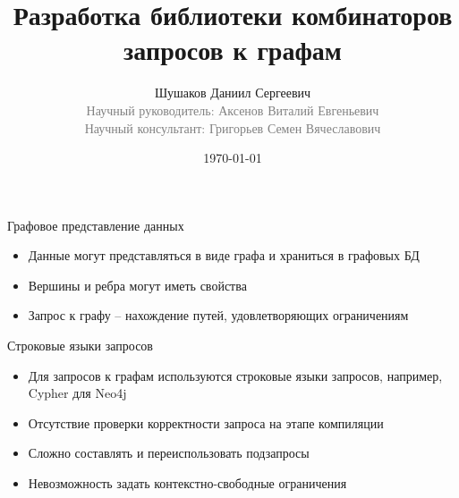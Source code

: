 \documentclass[aspectratio=169]{beamer}
\begin{document}
\title[Комбинаторы запросов к графам]
{
  Разработка библиотеки комбинаторов запросов к графам
}
\author[Шушаков Д.С.]
{
Шушаков Даниил Сергеевич\\
{\footnotesize\textcolor{gray}{Научный руководитель: Аксенов Виталий Евгеньевич}}\\
{\footnotesize\textcolor{gray}{Научный консультант: Григорьев Семен Вячеславович}}
}
\date{\today}

\frame{\titlepage}

\setlength{\parskip}{0.25cm}

\begin{frame}{Графовое представление данных}
  \begin{itemize}
    \item Данные могут представляться в виде графа и храниться в графовых БД
    \item Вершины и ребра могут иметь свойства
    \item Запрос к графу -- нахождение путей, удовлетворяющих ограничениям
  \end{itemize}
\end{frame}


\begin{frame}{Строковые языки запросов}
  \begin{itemize}
    \item Для запросов к графам используются строковые языки запросов, например, Cypher для Neo4j
    \item Отсутствие проверки корректности запроса на этапе компиляции
    \item Сложно составлять и переиспользовать подзапросы
    \item Невозможность задать контекстно-свободные ограничения
  \end{itemize}
\end{frame}
\end{document}
